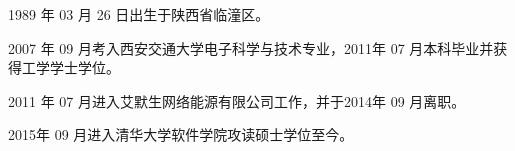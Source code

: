 \begin{resume}


  1989 年 03 月 26 日出生于陕西省临潼区。

  2007 年 09 月考入西安交通大学电子科学与技术专业，2011年 07 月本科毕业并获得工学学士学位。
  
  2011 年 07 月进入艾默生网络能源有限公司工作，并于2014年 09 月离职。

  2015年 09 月进入清华大学软件学院攻读硕士学位至今。


%
%
%

\end{resume}
